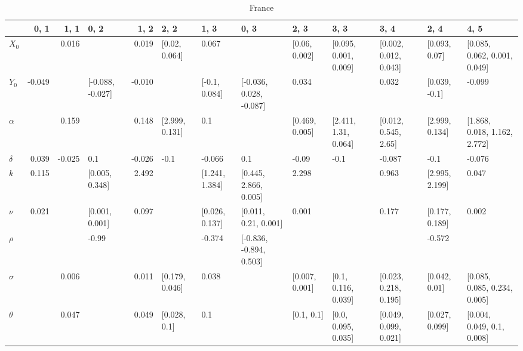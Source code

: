 \begin{table}[H]
	\centering
	\caption{France}
	\label{france_table}
	
	\begin{adjustbox}{width=\textwidth}
		
\begin{tabular}{lrrlrllllllll}
	\toprule
	{} &   0, 1 &   1, 1 &              0, 2 &   1, 2 &            2, 2 &            1, 3 &                     0, 3 &            2, 3 &                   3, 3 &                   3, 4 &            2, 4 &                          4, 5 \\
	\midrule
	$X_0$   &        &  0.016 &                   &  0.019 &   [0.02, 0.064] &           0.067 &                          &   [0.06, 0.002] &  [0.095, 0.001, 0.009] &  [0.002, 0.012, 0.043] &   [0.093, 0.07] &  [0.085, 0.062, 0.001, 0.049] \\
	$Y_0$   & -0.049 &        &  [-0.088, -0.027] & -0.010 &                 &   [-0.1, 0.084] &  [-0.036, 0.028, -0.087] &           0.034 &                        &                  0.032 &   [0.039, -0.1] &                        -0.099 \\
	$\alpha$ &        &  0.159 &                   &  0.148 &  [2.999, 0.131] &             0.1 &                          &  [0.469, 0.005] &   [2.411, 1.31, 0.064] &   [0.012, 0.545, 2.65] &  [2.999, 0.134] &  [1.868, 0.018, 1.162, 2.772] \\
	$\delta$ &  0.039 & -0.025 &               0.1 & -0.026 &            -0.1 &          -0.066 &                      0.1 &           -0.09 &                   -0.1 &                 -0.087 &            -0.1 &                        -0.076 \\
	$k$     &  0.115 &        &    [0.005, 0.348] &  2.492 &                 &  [1.241, 1.384] &    [0.445, 2.866, 0.005] &           2.298 &                        &                  0.963 &  [2.995, 2.199] &                         0.047 \\
	$\nu$    &  0.021 &        &    [0.001, 0.001] &  0.097 &                 &  [0.026, 0.137] &     [0.011, 0.21, 0.001] &           0.001 &                        &                  0.177 &  [0.177, 0.189] &                         0.002 \\
	$\rho$   &        &        &             -0.99 &        &                 &          -0.374 &  [-0.836, -0.894, 0.503] &                 &                        &                        &          -0.572 &                               \\
	$\sigma$ &        &  0.006 &                   &  0.011 &  [0.179, 0.046] &           0.038 &                          &  [0.007, 0.001] &    [0.1, 0.116, 0.039] &  [0.023, 0.218, 0.195] &   [0.042, 0.01] &  [0.085, 0.085, 0.234, 0.005] \\
	$\theta$ &        &  0.047 &                   &  0.049 &    [0.028, 0.1] &             0.1 &                          &      [0.1, 0.1] &    [0.0, 0.095, 0.035] &  [0.049, 0.099, 0.021] &  [0.027, 0.099] &    [0.004, 0.049, 0.1, 0.008] \\
	\bottomrule
\end{tabular}
		

\end{adjustbox}
\end{table}
